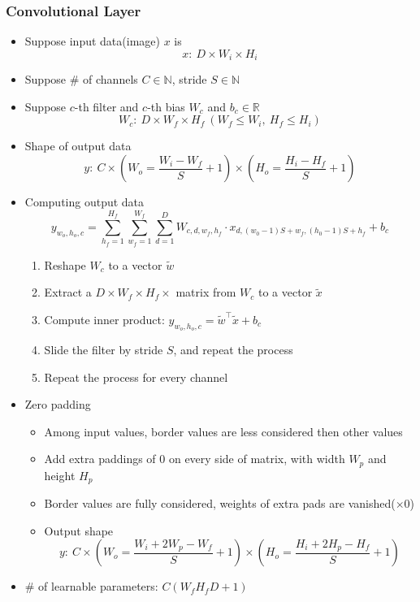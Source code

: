 \subsubsection*{Convolutional Layer}
\begin{itemize}
    \item Suppose input data(image) $x$ is
    \begin{equation}
        x:~D\times W_i\times H_i
    \end{equation}
    \item Suppose \# of channels $C\in\mathbb{N}$, stride $S\in\mathbb{N}$
    \item Suppose $c$-th filter and $c$-th bias $W_c$ and $b_c\in\mathbb{R}$
    \begin{equation}
        W_c:~D\times W_f\times H_f~(W_f\leq W_i,~H_f\leq H_i)
    \end{equation}
    \item Shape of output data
    \begin{equation}
        y:~C\times\left(W_o=\frac{W_i-W_f}{S}+1\right)\times\left(H_o=\frac{H_i-H_f}{S}+1\right)
    \end{equation}
    \item Computing output data
    \begin{equation}
        y_{w_o,h_o,c}=\sum_{h_f=1}^{H_f}\sum_{w_f=1}^{W_f}\sum_{d=1}^DW_{c,d,w_f,h_f}\cdot x_{d,(w_0-1)S+w_f,(h_0-1)S+h_f}+b_c
    \end{equation}
    \begin{enumerate}
        \item Reshape $W_c$ to a vector $\tilde{w}$
        \item Extract a $D\times W_f\times H_f\times$ matrix from $W_c$ to a vector $\tilde{x}$
        \item Compute inner product: $y_{w_o,h_o,c}=\tilde{w}^{\top}\tilde{x}+b_c$
        \item Slide the filter by stride $S$, and repeat the process
        \item Repeat the process for every channel
    \end{enumerate}
    \item Zero padding
    \begin{itemize}
        \item Among input values, border values are less considered then other values
        \item Add extra paddings of 0 on every side of matrix, with width $W_p$ and height $H_p$
        \item Border values are fully considered, weights of extra pads are vanished($\times 0$)
        \item Output shape
        \begin{equation}
            y:~C\times\left(W_o=\frac{W_i+2W_p-W_f}{S}+1\right)\times\left(H_o=\frac{H_i+2H_p-H_f}{S}+1\right)
        \end{equation}
    \end{itemize}
    \item \# of learnable parameters: $C(W_fH_fD+1)$
\end{itemize}

